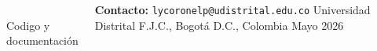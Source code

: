 \documentclass[25pt, portrait, margin=15mm,
    innermargin=15mm, blockverticalspace=12mm, colspace=20mm]{tikzposter}
\begin{document}
\begin{columns}
{    \vspace{1em}
    \begin{center}
    \\[0.5em]
    {\normalsize Codigo y documentación}
    \end{center}

    \vspace{0.5em}
    \begin{center}
    \textbf{Contacto:} \texttt{lycoronelp@udistrital.edu.co} \hfill
    Universidad Distrital F.J.C., Bogotá D.C., Colombia \hfill Mayo 2026
    \end{center}
}

\end{columns}
\end{document}
